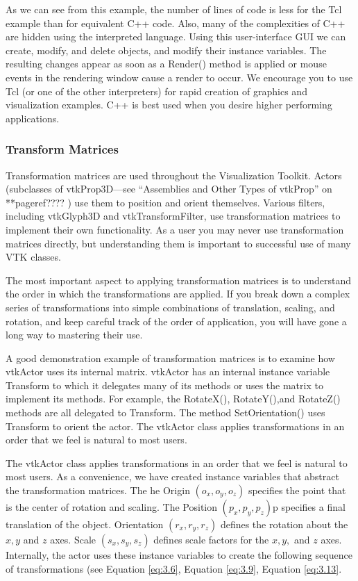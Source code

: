 As we can see from this example, the number of lines of code is less for the Tcl example than for equivalent C++ code. Also, many of the complexities of C++ are hidden using the interpreted language. Using this user-interface GUI we can create, modify, and delete objects, and modify their instance variables. The resulting changes appear as soon as a Render() method is applied or mouse events in the rendering window cause a render to occur. We encourage you to use Tcl (or one of the other interpreters) for rapid creation of graphics and visualization examples. C++ is best used when you desire higher performing applications.

\subsubsection{Transform Matrices}
\label{sec:transform_matrices}

Transformation matrices are used throughout the  Visualization Toolkit. Actors (subclasses of vtkProp3D—see ``Assemblies and Other Types of vtkProp'' on **pageref???? ) use them to position and orient themselves. Various filters, including vtkGlyph3D and vtkTransformFilter, use transformation matrices to implement their own functionality. As a user you may never use transformation matrices directly, but understanding them is important to successful use of many VTK classes.

The most important aspect to applying transformation matrices is to understand the order in which the transformations are applied. If you break down a complex series of transformations into simple combinations of translation, scaling, and rotation, and keep careful track of the order of application, you will have gone a long way to mastering their use.

A good demonstration example of transformation matrices is to examine how vtkActor uses its internal matrix. vtkActor has an internal instance variable Transform to which it delegates many of its methods or uses the matrix to implement its methods. For example, the RotateX(), RotateY(),and RotateZ() methods are all delegated to Transform. The method SetOrientation() uses Transform to orient the actor. The vtkActor class applies transformations in an order that we feel is natural to most users.

The vtkActor class applies transformations in an order that we feel is natural to most users. As a convenience, we have created instance variables that abstract the transformation matrices. The he Origin $(o_x,o_y,o_z)$ specifies the point that is the center of rotation and scaling. The Position $(p_x, p_y, p_z)$p specifies a final translation of the object. Orientation $(r_x, r_y, r_z)$ defines the rotation about the $x, y$ and $z$ axes. Scale $(s_x, s_y, s_z)$ defines scale factors for the $x, y,$ and $z$ axes. Internally, the actor uses these instance variables to create the following sequence of transformations (see Equation \eqref{eq:3.6}, Equation \eqref{eq:3.9},  Equation \eqref{eq:3.13}.

